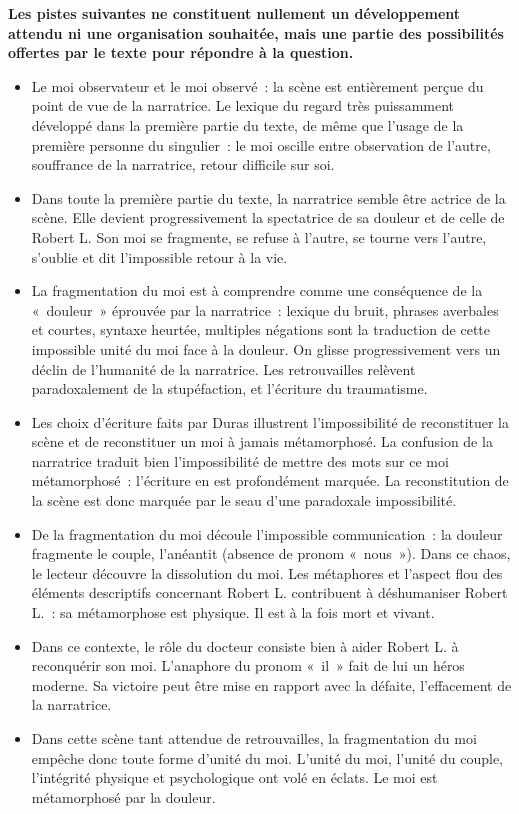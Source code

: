 {\textbf{Les pistes suivantes ne constituent nullement un développement attendu ni une
organisation souhaitée, mais une partie des possibilités offertes par le texte pour répondre
à la question.}

\begin{itemize}
\item Le moi observateur et le moi observé~: la scène est entièrement perçue du point de vue
de la narratrice. Le lexique du regard très puissamment développé dans la première partie
du texte, de même que l'usage de la première personne du singulier~: le moi oscille entre
observation de l'autre, souffrance de la narratrice, retour difficile sur soi.
\item Dans toute la première partie du texte, la narratrice semble être actrice de la scène. Elle
devient progressivement la spectatrice de sa douleur et de celle de Robert L. Son moi se
fragmente, se refuse à l'autre, se tourne vers l'autre, s'oublie et dit l'impossible retour à la
vie.
\item La fragmentation du moi est à comprendre comme une conséquence de la «~douleur~»
éprouvée par la narratrice~: lexique du bruit, phrases averbales et courtes, syntaxe
heurtée, multiples négations sont la traduction de cette impossible unité du moi face à la
douleur. On glisse progressivement vers un déclin de l'humanité de la narratrice. Les
retrouvailles relèvent paradoxalement de la stupéfaction, et l'écriture du traumatisme.
\item Les choix d'écriture faits par Duras illustrent l'impossibilité de reconstituer la scène et de
reconstituer un moi à jamais métamorphosé. La confusion de la narratrice traduit bien
l'impossibilité de mettre des mots sur ce moi métamorphosé~: l'écriture en est
profondément marquée. La reconstitution de la scène est donc marquée par le seau d'une
paradoxale impossibilité.
\item De la fragmentation du moi découle l'impossible communication~: la douleur fragmente le
couple, l'anéantit (absence de pronom «~nous~»). Dans ce chaos, le lecteur découvre la
dissolution du moi. Les métaphores et l'aspect flou des éléments descriptifs concernant
Robert L. contribuent à déshumaniser Robert L.~: sa métamorphose est physique. Il est à
la fois mort et vivant.
\item Dans ce contexte, le rôle du docteur consiste bien à aider Robert L. à reconquérir son
moi. L'anaphore du pronom «~il~» fait de lui un héros moderne. Sa victoire peut être mise
en rapport avec la défaite, l'effacement de la narratrice.
\item Dans cette scène tant attendue de retrouvailles, la fragmentation du moi empêche donc
toute forme d'unité du moi. L'unité du moi, l'unité du couple, l'intégrité physique et
psychologique ont volé en éclats. Le moi est métamorphosé par la douleur.
\end{itemize}}%
